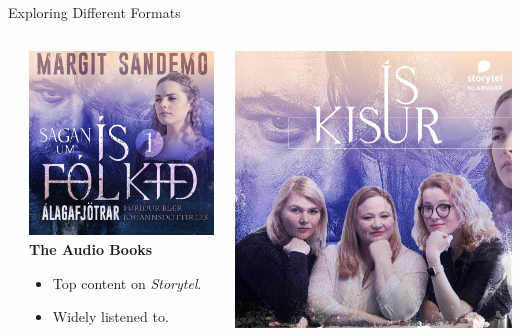 \begin{frame}{Exploring Different Formats}
\begin{columns}[T]
\begin{column}{0.32\textwidth}
    \end{column}
    \begin{column}{0.32\textwidth}
        \includegraphics[width=\textwidth]{../figures/álagafjötrar_storytel}\\
      \textbf{The Audio Books}
      \begin{itemize}
        \item Top content on \emph{Storytel}.
        \item Widely listened to.
      \end{itemize}
    \end{column}
\begin{column}{0.32\textwidth}
  \includegraphics[width=\textwidth]{../figures/álagafjötrar_ískisur}\\

\end{column}
\end{columns}
\end{frame}
